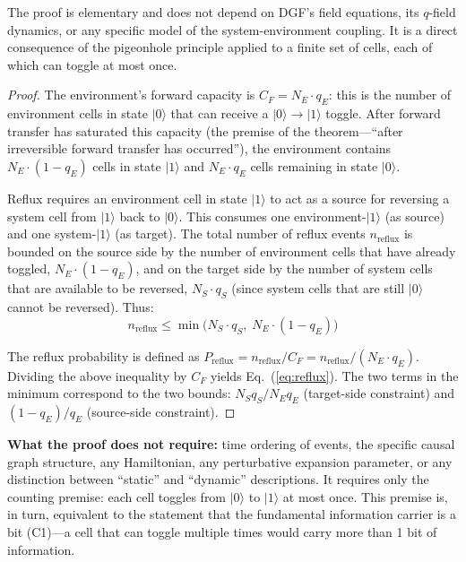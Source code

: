 \documentclass[12pt,a4paper]{article}
\theoremstyle{definition}
\theoremstyle{remark}
\begin{document}
The proof is elementary and does not depend on DGF's field equations, its $q$-field dynamics, or any specific model of the system-environment coupling. It is a direct consequence of the pigeonhole principle applied to a finite set of cells, each of which can toggle at most once.

\begin{proof}
The environment's forward capacity is $C_F = N_E \cdot q_E$: this is the number of environment cells in state $|0\rangle$ that can receive a $|0\rangle \to |1\rangle$ toggle. After forward transfer has saturated this capacity (the premise of the theorem---``after irreversible forward transfer has occurred''), the environment contains $N_E \cdot (1-q_E)$ cells in state $|1\rangle$ and $N_E \cdot q_E$ cells remaining in state $|0\rangle$.

Reflux requires an environment cell in state $|1\rangle$ to act as a source for reversing a system cell from $|1\rangle$ back to $|0\rangle$. This consumes one environment-$|1\rangle$ (as source) and one system-$|1\rangle$ (as target). The total number of reflux events $n_{\mathrm{reflux}}$ is bounded on the source side by the number of environment cells that have already toggled, $N_E \cdot (1-q_E)$, and on the target side by the number of system cells that are available to be reversed, $N_S \cdot q_S$ (since system cells that are still $|0\rangle$ cannot be reversed). Thus:
\begin{equation}
n_{\mathrm{reflux}} \leq \min\!\big(N_S \cdot q_S,\; N_E \cdot (1-q_E)\big)
\end{equation}

The reflux probability is defined as $P_{\mathrm{reflux}} = n_{\mathrm{reflux}} / C_F = n_{\mathrm{reflux}} / (N_E \cdot q_E)$. Dividing the above inequality by $C_F$ yields Eq.~(\ref{eq:reflux}). The two terms in the minimum correspond to the two bounds: $N_S q_S / N_E q_E$ (target-side constraint) and $(1-q_E)/q_E$ (source-side constraint).
\end{proof}

\textbf{What the proof does not require:} time ordering of events, the specific causal graph structure, any Hamiltonian, any perturbative expansion parameter, or any distinction between ``static'' and ``dynamic'' descriptions. It requires only the counting premise: each cell toggles from $|0\rangle$ to $|1\rangle$ at most once. This premise is, in turn, equivalent to the statement that the fundamental information carrier is a bit (C1)---a cell that can toggle multiple times would carry more than 1 bit of information.
\end{document}
